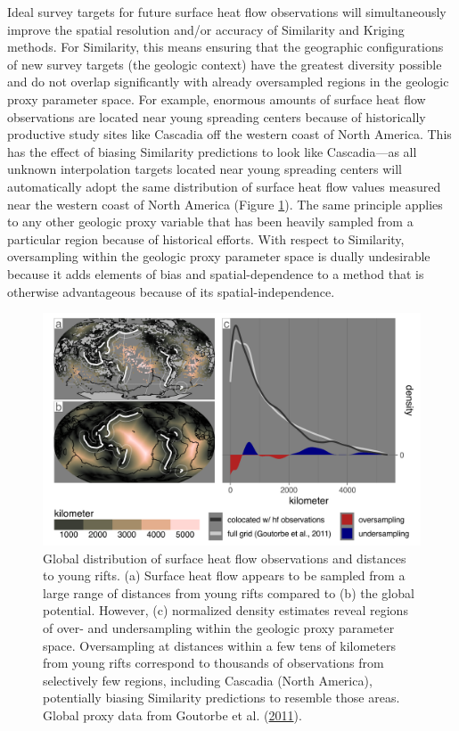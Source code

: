 Ideal survey targets for future surface heat flow observations will simultaneously improve the spatial resolution and/or accuracy of Similarity and Kriging methods. For Similarity, this means ensuring that the geographic configurations of new survey targets (the geologic context) have the greatest diversity possible and do not overlap significantly with already oversampled regions in the geologic proxy parameter space. For example, enormous amounts of surface heat flow observations are located near young spreading centers because of historically productive study sites like Cascadia off the western coast of North America. This has the effect of biasing Similarity predictions to look like Cascadia---as all unknown interpolation targets located near young spreading centers will automatically adopt the same distribution of surface heat flow values measured near the western coast of North America (Figure \ref{fig:cascadiaBias}). The same principle applies to any other geologic proxy variable that has been heavily sampled from a particular region because of historical efforts. With respect to Similarity, oversampling within the geologic proxy parameter space is dually undesirable because it adds elements of bias and spatial-dependence to a method that is otherwise advantageous because of its spatial-independence.



\begin{figure}[htbp]

{\centering \includegraphics[width=1\linewidth,]{assets/figs/chpt3/cascadiaBias} 

}

\caption[Surface heat flow profiles for New Britain Solomon upper-plate sectors]{Global distribution of surface heat flow observations and distances to young rifts. (a) Surface heat flow appears to be sampled from a large range of distances from young rifts compared to (b) the global potential. However, (c) normalized density estimates reveal regions of over- and undersampling within the geologic proxy parameter space. Oversampling at distances within a few tens of kilometers from young rifts correspond to thousands of observations from selectively few regions, including Cascadia (North America), potentially biasing Similarity predictions to resemble those areas. Global proxy data from Goutorbe et al. (\protect\hyperlink{ref-goutorbe2011}{2011}).}\label{fig:cascadiaBias}
\end{figure}

